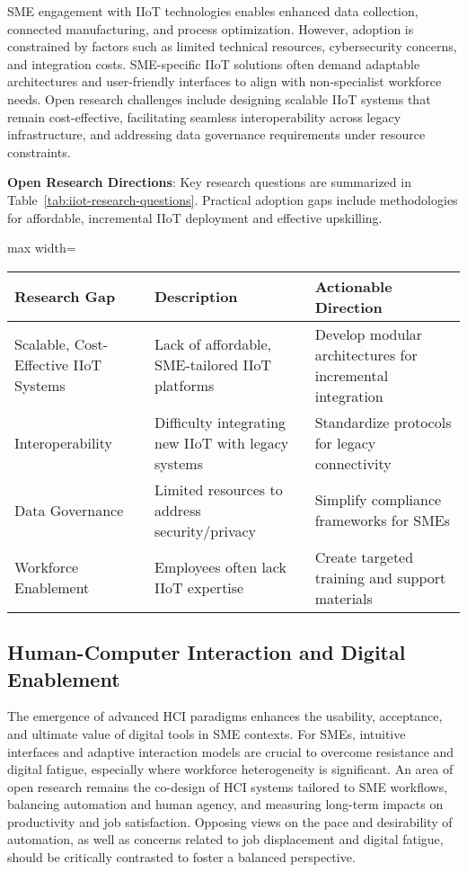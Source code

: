 \documentclass[sigconf]{acmart}
\begin{document}
SME engagement with IIoT technologies enables enhanced data collection, connected manufacturing, and process optimization. However, adoption is constrained by factors such as limited technical resources, cybersecurity concerns, and integration costs. SME-specific IIoT solutions often demand adaptable architectures and user-friendly interfaces to align with non-specialist workforce needs. Open research challenges include designing scalable IIoT systems that remain cost-effective, facilitating seamless interoperability across legacy infrastructure, and addressing data governance requirements under resource constraints.

\textbf{Open Research Directions}: Key research questions are summarized in Table~\ref{tab:iiot-research-questions}. Practical adoption gaps include methodologies for affordable, incremental IIoT deployment and effective upskilling.

\begin{table*}[htbp]
\centering
\caption{Open Research Questions in IIoT Adoption for SMEs}
\label{tab:iiot-research-questions}
\begin{adjustbox}{max width=\textwidth}
\begin{tabular}{@{}lll@{}}
\toprule
Research Gap & Description & Actionable Direction \\
\midrule
Scalable, Cost-Effective IIoT Systems & Lack of affordable, SME-tailored IIoT platforms & Develop modular architectures for incremental integration \\
Interoperability & Difficulty integrating new IIoT with legacy systems & Standardize protocols for legacy connectivity \\
Data Governance & Limited resources to address security/privacy & Simplify compliance frameworks for SMEs \\
Workforce Enablement & Employees often lack IIoT expertise & Create targeted training and support materials \\
\bottomrule
\end{tabular}
\end{adjustbox}
\end{table*}

\subsection{Human-Computer Interaction and Digital Enablement}

The emergence of advanced HCI paradigms enhances the usability, acceptance, and ultimate value of digital tools in SME contexts. For SMEs, intuitive interfaces and adaptive interaction models are crucial to overcome resistance and digital fatigue, especially where workforce heterogeneity is significant. An area of open research remains the co-design of HCI systems tailored to SME workflows, balancing automation and human agency, and measuring long-term impacts on productivity and job satisfaction. Opposing views on the pace and desirability of automation, as well as concerns related to job displacement and digital fatigue, should be critically contrasted to foster a balanced perspective.
\end{document}
